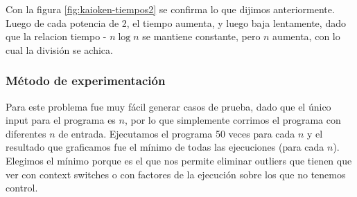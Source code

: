 Con la figura \ref{fig:kaioken-tiempos2} se confirma lo que dijimos anteriormente. Luego de cada potencia de 2, el tiempo aumenta, y luego baja lentamente, dado que la relacion tiempo - $n \log n$ se mantiene constante, pero $n$ aumenta, con lo cual la división se achica.


\subsubsection{M\'etodo de experimentación}

Para este problema fue muy fácil generar casos de prueba, dado que el único input para el programa es $n$, por lo que simplemente corrimos el programa con diferentes $n$ de entrada. Ejecutamos el programa 50 veces para cada $n$ y el resultado que graficamos fue el mínimo de todas las ejecuciones (para cada $n$). Elegimos el mínimo porque es el que nos permite eliminar outliers que tienen que ver con context switches o con factores de la ejecución sobre los que no tenemos control.


